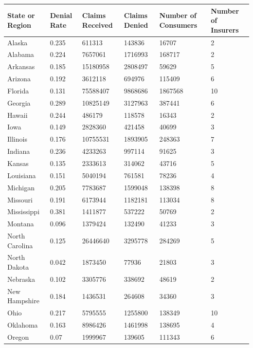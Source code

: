 \documentclass[12pt, a4paper]{report}
\begin{document}
\begin{table}[!ht]
	\centering
	\begin{tabular}{|p{3cm}|p{2cm}|p{2cm}|p{2cm}|p{3cm}|p{2cm}|}
		\hline
		State or Region & Denial Rate & Claims Received & Claims Denied & Number of Consumers & Number of Insurers \\ \hline
		Alaska & 0.235 & 611313 & 143836 & 16707 & 2 \\ \hline
		Alabama & 0.224 & 7657061 & 1716993 & 168717 & 2 \\ \hline
		Arkansas & 0.185 & 15180958 & 2808497 & 59629 & 5 \\ \hline
		Arizona & 0.192 & 3612118 & 694976 & 115409 & 6 \\ \hline
		Florida & 0.131 & 75588407 & 9868686 & 1867568 & 10 \\ \hline
		Georgia & 0.289 & 10825149 & 3127963 & 387441 & 6 \\ \hline
		Hawaii & 0.244 & 486179 & 118578 & 16343 & 2 \\ \hline
		Iowa & 0.149 & 2828360 & 421458 & 40699 & 3 \\ \hline
		Illinois & 0.176 & 10755531 & 1893905 & 248363 & 7 \\ \hline
		Indiana & 0.236 & 4233263 & 997114 & 91625 & 3 \\ \hline
		Kansas & 0.135 & 2333613 & 314062 & 43716 & 5 \\ \hline
		Louisiana & 0.151 & 5040194 & 761581 & 78236 & 4 \\ \hline
		Michigan & 0.205 & 7783687 & 1599048 & 138398 & 8 \\ \hline
		Missouri & 0.191 & 6173944 & 1182181 & 113034 & 8 \\ \hline
		Mississippi & 0.381 & 1411877 & 537222 & 50769 & 2 \\ \hline
		Montana & 0.096 & 1379424 & 132490 & 41233 & 3 \\ \hline
		North Carolina & 0.125 & 26446640 & 3295778 & 284269 & 5 \\ \hline
		North Dakota & 0.042 & 1873450 & 77936 & 21803 & 3 \\ \hline
		Nebraska & 0.102 & 3305776 & 338692 & 48619 & 2 \\ \hline
		New Hampshire & 0.184 & 1436531 & 264608 & 34360 & 3 \\ \hline
		Ohio & 0.217 & 5795555 & 1255800 & 138349 & 10 \\ \hline
		Oklahoma & 0.163 & 8986426 & 1461998 & 138695 & 4 \\ \hline
		Oregon & 0.07 & 1999967 & 139605 & 111343 & 6 \\ \hline

\end{tabular}
\end{table}
\end{document}

